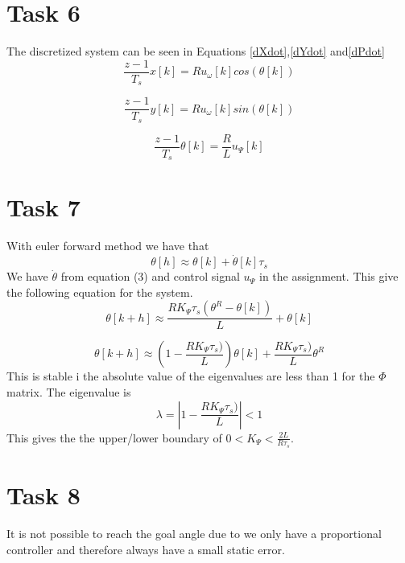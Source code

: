 \documentclass[a4paper,12pt,oneside,onecolumn]{article} %
\begin{document}
\section*{Task 6}

The discretized system can be seen in Equations \eqref{dXdot},\eqref{dYdot} and\eqref{dPdot}
\begin{equation}
\frac{z-1}{T_s} x[k] = Ru_\omega[k] cos(\theta[k])\label{dXdot}
\end{equation}

\begin{equation}
\frac{z-1}{T_s} y[k] = Ru_\omega[k] sin(\theta[k]) \label{dYdot}
\end{equation}

\begin{equation}
\frac{z-1}{T_s} \theta[k] = \frac{R}{L}u_\Psi[k]\label{dPdot}
\end{equation}


\section*{Task 7}

With euler forward method we have that
\begin{equation*}
\theta[h]\approx \theta[k]+\dot{\theta}[k]\tau_s
\end{equation*}
We have $\dot{\theta}$ from equation (3) and control signal $u_\Psi$ in the assignment. This give the following equation for the system.
\begin{equation*}
\theta[k+h]\approx  \frac{R K_\Psi \tau_s(\theta^R-\theta[k])}{L}+\theta[k]
\end{equation*}

\begin{equation*}
\theta[k+h]\approx  (1-\frac{R K_\Psi \tau_s)}{L})\theta[k]+\frac{R K_\Psi \tau_s)}{L}\theta^R
\end{equation*}
This is stable i the absolute value of the eigenvalues are less than 1 for the $\Phi$ matrix. The eigenvalue is
\begin{equation*}
\lambda = |1-\frac{R K_\Psi \tau_s)}{L}|<1
\end{equation*}
This gives the the upper/lower boundary of $0<K_\Psi<\frac{2L}{R\tau_s}$. 

\section*{Task 8}

It is not possible to reach the goal angle due to we only have a proportional controller and therefore always have a small static error.
\end{document}
